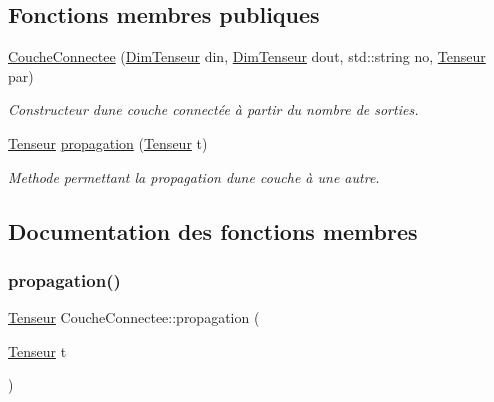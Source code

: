 \subsection*{Fonctions membres publiques}
\begin{DoxyCompactItemize}
\item 
\mbox{\label{classCoucheConnectee_a57bb158c3d73fc0b19cc44cdc2946e0d}} 
\hyperlink{classCoucheConnectee_a57bb158c3d73fc0b19cc44cdc2946e0d}{Couche\+Connectee} (\hyperlink{classDimTenseur}{Dim\+Tenseur} din, \hyperlink{classDimTenseur}{Dim\+Tenseur} dout, std\+::string no, \hyperlink{classTenseur}{Tenseur} par)
\begin{DoxyCompactList}\small\item\em Constructeur d\textquotesingle{}une couche connectée à partir du nombre de sorties. \end{DoxyCompactList}\item 
\hyperlink{classTenseur}{Tenseur} \hyperlink{classCoucheConnectee_acd60c499c6c74f914795f45f3f8084d0}{propagation} (\hyperlink{classTenseur}{Tenseur} t)
\begin{DoxyCompactList}\small\item\em Methode permettant la propagation d\textquotesingle{}une couche à une autre. \end{DoxyCompactList}\end{DoxyCompactItemize}


\subsection{Documentation des fonctions membres}
\mbox{\label{classCoucheConnectee_acd60c499c6c74f914795f45f3f8084d0}} 
\subsubsection{\texorpdfstring{propagation()}{propagation()}}
{\footnotesize\ttfamily \hyperlink{classTenseur}{Tenseur} Couche\+Connectee\+::propagation (\begin{DoxyParamCaption}\item[{\hyperlink{classTenseur}{Tenseur}}]{t }\end{DoxyParamCaption})\hspace{0.3cm}{\ttfamily [virtual]}}



